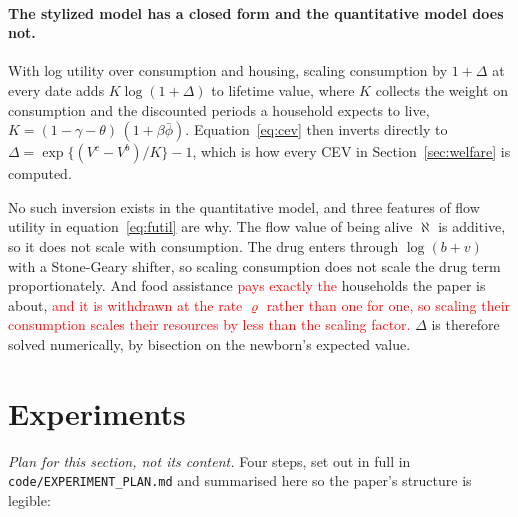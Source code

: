 \documentclass[10pt]{article}
\begin{document}
\paragraph{The stylized model has a closed form and the quantitative model does not.}
With log utility over consumption and housing, scaling consumption by $1+\Delta$ at
every date adds $K\log(1+\Delta)$ to lifetime value, where $K$ collects the weight on
consumption and the discounted periods a household expects to live,
$K=(1-\gamma-\theta)\,(1+\beta\bar\phi)$. Equation~\eqref{eq:cev} then inverts
directly to $\Delta=\exp\{(V^{c}-V^{b})/K\}-1$, which is how every CEV
in Section~\ref{sec:welfare} is computed.

No such inversion exists in the quantitative model, and three features of flow utility
in equation~\eqref{eq:futil} are why. The flow value of being alive $\aleph$ is additive,
so it does not scale with consumption. The drug enters through $\log(b+v)$ with a
Stone-Geary shifter, so scaling consumption does not scale the drug term
proportionately. And food assistance \textcolor{red}{pays exactly the}
households the paper is about, \textcolor{red}{and it is withdrawn at the rate $\varrho$ rather than one for one,}
\textcolor{red}{so scaling their consumption scales their resources by less than the scaling factor.} $\Delta$ is therefore solved numerically, by bisection on
the newborn's expected value.


\section{Experiments}\label{sec:experiments}

\emph{Plan for this section, not its content.} Four steps, set out in
full in \texttt{code/EXPERIMENT\_PLAN.md} and summarised here so the paper's structure
is legible:
\end{document}
